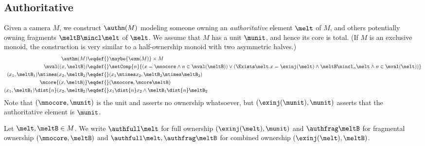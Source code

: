 



\subsection{Authoritative}
\label{sec:auth-camera}

Given a camera $M$, we construct $\authm(M)$ modeling someone owning an \emph{authoritative} element $\melt$ of $M$, and others potentially owning fragments $\meltB \mincl \melt$ of $\melt$.
We assume that $M$ has a unit $\munit$, and hence its core is total.
(If $M$ is an exclusive monoid, the construction is very similar to a half-ownership monoid with two asymmetric halves.)
\begin{align*}
\authm(M) \eqdef{}& \maybe{\exm(M)} \times M \\
\mval( (x, \meltB ) ) \eqdef{}& \setComp{ n }{ (x = \mnocore \land n \in \mval(\meltB)) \lor (\Exists \melt. x = \exinj(\melt) \land \meltB \mincl_n \melt \land n \in \mval(\melt)) } \\
  (x_1, \meltB_1) \mtimes (x_2, \meltB_2) \eqdef{}& (x_1 \mtimes x_2, \meltB_2 \mtimes \meltB_2) \\
  \mcore{(x, \meltB)} \eqdef{}& (\mnocore, \mcore\meltB) \\
  (x_1, \meltB_1) \dist{n} (x_2, \meltB_2) \eqdef{}& x_1 \dist{n} x_2 \land \meltB_1 \dist{n} \meltB_2
\end{align*}
Note that $(\mnocore, \munit)$ is the unit and asserts no ownership whatsoever, but $(\exinj(\munit), \munit)$ asserts that the authoritative element is $\munit$.

Let $\melt, \meltB \in M$.
We write $\authfull \melt$ for full ownership $(\exinj(\melt), \munit)$ and $\authfrag \meltB$ for fragmental ownership $(\mnocore, \meltB)$ and $\authfull \melt , \authfrag \meltB$ for combined ownership $(\exinj(\melt), \meltB)$.


